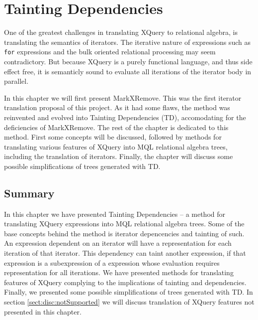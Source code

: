 \chapter{Tainting Dependencies}
\label{sect:translation}
\label{chapter:translation}

One of the greatest challenges in translating XQuery to relational algebra, is translating the semantics of
iterators. The iterative nature of expressions such as \texttt{for} expressions and the bulk oriented relational
processing may seem contradictory. But because XQuery is a purely functional language, and thus side effect free,
it is semanticly sound to evaluate all iterations of the iterator body in parallel.

In this chapter we will first present MarkXRemove. This was the first iterator translation proposal of this
project. As it had some flaws, the method was reinvented and evolved into Tainting Dependencies (TD), accomodating
for the deficiencies of MarkXRemove. The rest of the chapter is dedicated to this method. First some concepts will
be discussed, followed by methods for translating various features of XQuery into MQL relational algebra trees,
including the translation of iterators. Finally, the chapter will discuss some possible simplifications of trees
generated with TD.













\section{Summary}
\label{sect:trans:summary}

In this chapter we have presented Tainting Dependencies -- a method for translating XQuery expressions into MQL
relational algebra trees. Some of the base concepts behind the method is iterator depencencies and tainting of
such. An expression dependent on an iterator will have a representation for each iteration of that iterator. This
dependency can taint another expression, if that expression is a subexpression of a expression whose evaluation
requires representation for all iterations. We have presented methods for translating features of XQuery complying
to the implications of tainting and dependencies. Finally, we presented some possible simplifications of trees
generated with TD. In section \ref{sect:disc:notSupported} we will discuss translation of XQuery features not
presented in this chapter.